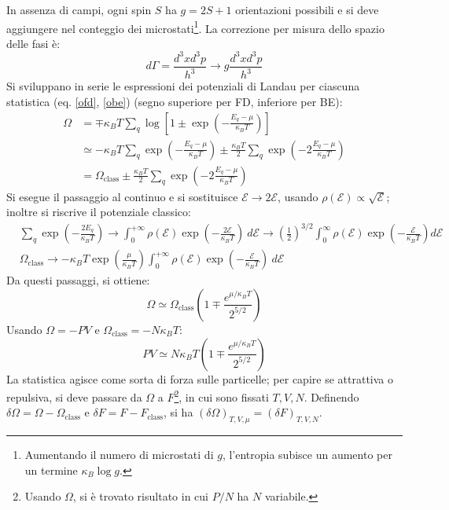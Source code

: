 \documentclass[10pt, a4paper]{scrartcl}
\numberwithin{equation}{subsection}
\theoremstyle{style1}
\begin{document}
In assenza di campi, ogni spin $S$ ha $g = 2S + 1$ orientazioni possibili e si deve aggiungere nel conteggio dei microstati\footnote{Aumentando il numero di microstati di $g$, l'entropia subisce un aumento per un termine $\kappa _B \log g$.}. La correzione per misura dello spazio delle fasi \`e:
\[
d\Gamma= \frac{d^3 x d^3 p }{h^3}\to g \frac{d^3 xd^3p}{h^3}
\] 
Si sviluppano in serie le espressioni dei potenziali di Landau per ciascuna statistica (eq. \ref{ofd}, \ref{obe}) (segno superiore per FD, inferiore per BE):
\begin{equation*}
	\begin{split}
		\Omega &= \mp \kappa _B T \sum_{q}^{} \log \left[ 1\pm \exp\left( - \frac{E_q - \mu }{\kappa _B T}\right)  \right] \\
		       &\simeq -\kappa _B T \sum_{q}^{} \exp \left(-\frac{E_q - \mu }{\kappa _B T} \right) \pm \frac{\kappa _B T }{2}\sum_{q}^{} \exp \left(-2 \frac{E_q - \mu }{\kappa_B T }\right) \\
		       &= \Omega _\text{class} \pm \frac{\kappa _B T}{2} \sum_{q}^{} \exp \left( - 2 \frac{E_q - \mu }{\kappa _B T}\right) 
	\end{split}
\end{equation*}
Si esegue il passaggio al continuo e si sostituisce $\mathscr{E} \to 2\mathscr{E}$, usando $\rho (\mathscr{E}) \propto \sqrt{\mathscr{E}} $; inoltre si riscrive il potenziale classico:
\[
\begin{split}
	&\sum_{q}^{} \exp \left(- \frac{2 E_q}{\kappa _B T}\right)  \to \int_{0} ^{+\infty} \rho (\mathscr{E}) \exp \left(-\frac{2\mathscr{E}}{\kappa _B T}\right) \ d\mathscr{E} \to \left(\frac{1}{2}\right) ^{3 / 2} \int_{0} ^{\infty} \rho (\mathscr{E}) \exp\left(- \frac{\mathscr{E}}{\kappa _B T}\right)  d \mathscr{E}\\
	& \Omega _\text{class} \to - \kappa _B T \exp \left(\frac{\mu  }{\kappa _B T}\right)  \int_{0} ^{+\infty} \rho (\mathscr{E}) \exp \left(- \frac{\mathscr{E}}{\kappa _B T}\right) \ d \mathscr{E}
\end{split}
\] 
Da questi passaggi, si ottiene:
\begin{equation}
	\Omega \simeq \Omega _{\text{class}} \left(1 \mp \frac{e^{ \mu  / \kappa _B  T} }{2 ^{5 / 2} }\right) 
\end{equation}
Usando $\Omega  = - PV $ e $\Omega _\text{class} = - N \kappa _B T$:
\begin{equation}
	PV \simeq N\kappa _B T \left(1 \mp \frac{e^{ \mu  / \kappa _B T} }{2^{ 5 / 2} }\right) 
\end{equation}
La statistica agisce come sorta di forza sulle particelle; per capire se attrattiva o repulsiva, si deve passare da $\Omega $ a $F $\footnote{Usando $\Omega $, si \`e trovato risultato in cui $P / N$ ha $N$ variabile.}, in cui sono fissati $T,V,N$. Definendo $\delta \Omega = \Omega  - \Omega _\text{class}$ e $\delta F  = F - F_\text{class}$, si ha $(\delta \Omega ) _{T,V,\mu } = (\delta F) _{T,V,N} $. 
\end{document}
